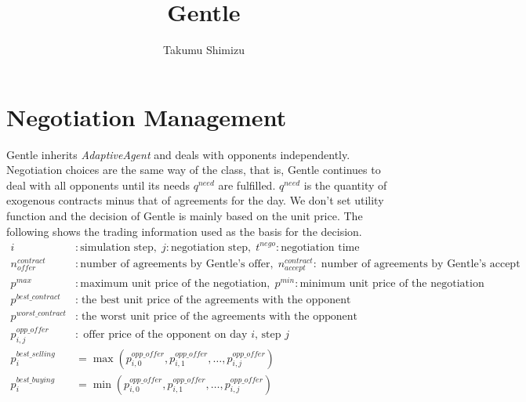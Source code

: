 \documentclass[uplatex, 10pt, a4j]{jsarticle}
\begin{document}
\title{Gentle}
\author{Takumu Shimizu}
\date{\vspace{-15mm}}

\maketitle

\section{\textrm{Negotiation Management}}
Gentle inherits \textit{AdaptiveAgent} and deals with opponents independently. 
Negotiation choices are the same way of the class, that is, Gentle continues to deal with all opponents until its needs $q^{need}$ are fulfilled.
$q^{need}$ is the quantity of exogenous contracts minus that of agreements for the day.
We don't set utility function and the decision of Gentle is mainly based on the unit price.
The following shows the trading information used as the basis for the decision.
\begin{equation*}
    \begin{split}
        i&:\text{simulation step}, \; j:\text{negotiation step}, \; t^{nego}:\text{negotiation time} \\
        n^{contract}_{offer}&:\text{number of agreements by Gentle's offer}, \; n^{contract}_{accept}: \; \text{number of agreements by Gentle's accept} \\
        p^{max}&:\text{maximum unit price of the negotiation}, \; p^{min}:\text{minimum unit price of the negotiation} \\
        p^{best\_contract} &: \; \text{the best unit price of the agreements with the opponent} \\
        p^{worst\_contract} &: \; \text{the worst unit price of the agreements with the opponent} \\
        p^{opp\_offer}_{i,j} &: \; \text{offer price of the opponent on day $i$, step $j$} \\
        p^{best\_selling}_{i} &= \max\left(p^{opp\_offer}_{i,0}, p^{opp\_offer}_{i,1}, \dots, p^{opp\_offer}_{i,j}\right) \\
        p^{best\_buying}_{i} &= \min\left(p^{opp\_offer}_{i,0}, p^{opp\_offer}_{i,1}, \dots, p^{opp\_offer}_{i,j}\right) \\    
    \end{split}
\end{equation*}
\end{document}
